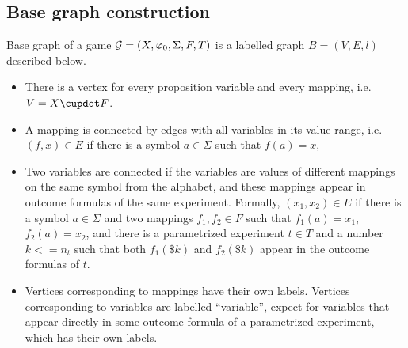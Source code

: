 \subsection{Base graph construction}
Base graph of a game $\mathcal{G} = (X, \varphi_0, \Sigma, F, T)$ is a labelled graph $B = (V,E,l)$ described below.
\begin{itemize}
\item There is a vertex for every proposition variable and every mapping, i.e. $V = \Var \cupdot F$.
\item A mapping is connected by edges with all variables in its value range, i.e. $(f, x) \in E$ if there is a symbol $a\in\Sigma$ such that $f(a) = x$,
\item Two variables are connected if the variables are values
  of different mappings on the same symbol from the alphabet,
  and these mappings appear in outcome formulas of the same experiment.
  Formally, $(x_1, x_2) \in E$ if there is a symbol $a\in\Sigma$ and two mappings
  $f_1,f_2\in F$ such that $f_1(a) = x_1$, $f_2(a) = x_2$, and
  there is a parametrized experiment $t\in T$ and a number $k <= n_t$ such that
  both $f_1(\$k)$ and $f_2(\$k)$ appear in the outcome formulas of $t$.
\item
  Vertices corresponding to mappings have their own labels.
  Vertices corresponding to variables are labelled ``variable'',
  expect for variables that appear directly in some outcome formula
  of a parametrized experiment, which has their own labels.
\end{itemize}


